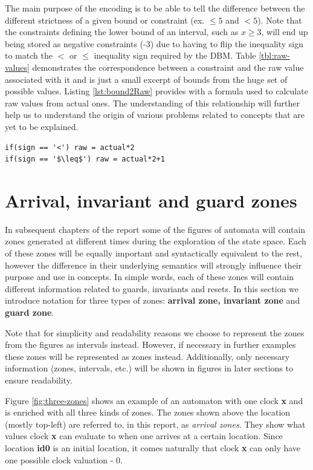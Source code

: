 The main purpose of the encoding is to be able to tell the difference between the different strictness of a given bound or constraint (ex. $\leq 5$ and $< 5$). Note that the constraints defining the lower bound of an interval, such as $x \geq 3$, will end up being stored as negative constraints (-3) due to having to flip the inequality sign to match the $<$ or $\leq$ inequality sign required by the DBM. Table \ref{tbl:raw-values} demonstrates the correspondence between a constraint and the raw value associated with it and is just a small excerpt of bounds from the huge set of possible values. Listing \ref{lst:bound2Raw} provides with a formula used to calculate raw values from actual ones. The understanding of this relationship will further help us to understand the origin of various problems related to concepts that are yet to be explained.

\begin{lstlisting}[caption = {Formula to calculate raw values from actual values}, label = {lst:bound2Raw}, mathescape=true]
if(sign == '<') raw = actual*2
if(sign == '$\leq$') raw = actual*2+1
\end{lstlisting}

\section{Arrival, invariant and guard zones}
In subsequent chapters of the report some of the figures of automata will contain zones generated at different times during the exploration of the state space. Each of these zones will be equally important and syntactically equivalent to the rest, however the difference in their underlying semantics will strongly influence their purpose and use in concepts. In simple words, each of these zones will contain different information related to guards, invariants and resets. In this section we introduce notation for three types of zones: \textbf{arrival zone, invariant zone} and \textbf{guard zone}.

Note that for simplicity and readability reasons we choose to represent the zones from the figures as intervals instead. However, if necessary in further examples these zones will be represented as zones instead. Additionally, only necessary information (zones, intervals, etc.) will be shown in figures in later sections to ensure readability.
 
Figure \ref{fig:three-zones} shows an example of an automaton with one clock \textbf{x} and is enriched with all three kinds of zones. The zones shown above the location (mostly top-left) are referred to, in this report, as \textit{arrival zones}. They show what values clock \textbf{x} can evaluate to when one arrives at a certain location. Since location \textbf{id0} is an initial location, it comes naturally that clock \textbf{x} can only have one possible clock valuation - $0$.

